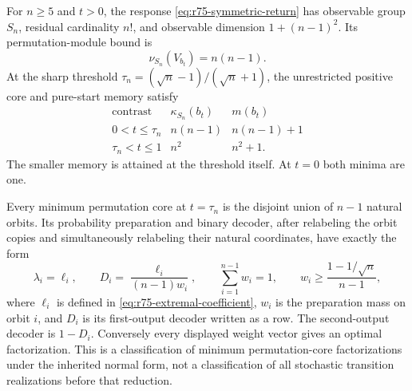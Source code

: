 \begin{theorem}
\label{thm:r75-symmetric-return}
For $n\ge5$ and $t>0$, the response \eqref{eq:r75-symmetric-return}
has observable group $S_n$, residual cardinality $n!$, and observable
dimension $1+(n-1)^2$. Its permutation-module bound is
\[
 \nu_{S_n}(V_{b_t})=n(n-1).
\]
At the sharp threshold $\tau_n=(\sqrt n-1)/(\sqrt n+1)$, the
unrestricted positive core and pure-start memory satisfy
\[
 \begin{array}{c|c|c}
 \text{contrast}&\kappa_{S_n}(b_t)&m(b_t)\\\hline
 0<t\le\tau_n&n(n-1)&n(n-1)+1\\
 \tau_n<t\le1&n^2&n^2+1.
 \end{array}
\]
The smaller memory is attained at the threshold itself. At $t=0$
both minima are one.

Every minimum permutation core at $t=\tau_n$ is the disjoint union
of $n-1$ natural orbits. Its probability preparation and binary
decoder, after relabeling the orbit copies and simultaneously
relabeling their natural coordinates, have exactly the form
\begin{equation}\label{eq:r75-threshold-factorizations}
 \lambda_i=\ell_i,\qquad
 D_i=\frac{\ell_i}{(n-1)w_i},\qquad
 \sum_{i=1}^{n-1}w_i=1,\qquad
 w_i\ge\frac{1-1/\sqrt n}{n-1},
\end{equation}
where $\ell_i$ is defined in \eqref{eq:r75-extremal-coefficient},
$w_i$ is the preparation mass on orbit $i$, and $D_i$ is its
first-output decoder written as a row. The second-output decoder
is $1-D_i$.
Conversely every displayed weight vector gives an optimal
factorization. This is a classification of minimum permutation-core
factorizations under the inherited normal form, not a classification
of all stochastic transition realizations before that reduction.
\end{theorem}
